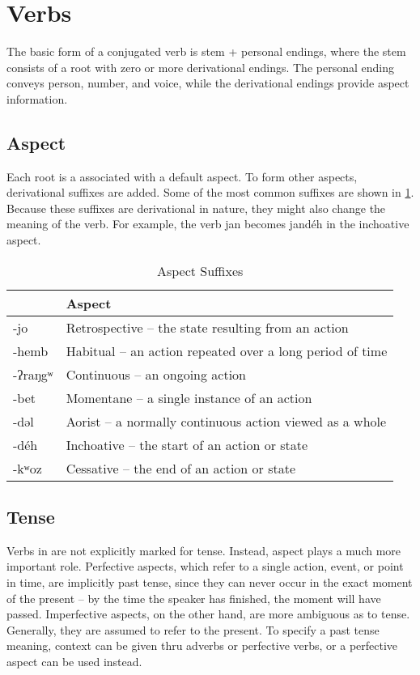 \section{Verbs}
The basic form of a conjugated verb is stem + personal endings, where the stem
consists of a root with zero or more derivational endings.
The personal ending conveys person, number, and voice, while the derivational
endings provide aspect information.

\subsection{Aspect}
Each root is a associated with a default aspect.
To form other aspects, derivational suffixes are added.
Some of the most common suffixes are shown in \cref{tab:aspect suffixes}.
Because these suffixes are derivational in nature, they might also change the
meaning of the verb.
For example, the verb {\ll jan}  becomes {\ll jandéh} 
in the inchoative aspect.

\begin{table}[h]
\centering
\caption{Aspect Suffixes}
\label{tab:aspect suffixes}
\begin{tabular}{>{\ll}l l}
    \toprule
    \multicolumn{1}{c}{Ending} & Aspect \\ \midrule
    -jo & Retrospective – the state resulting from an action \\
    -hemb & Habitual – an action repeated over a long period of time \\
    -ʔraŋgʷ & Continuous – an ongoing action \\
    -bet & Momentane – a single instance of an action \\
    -dəl & Aorist – a normally continuous action viewed as a whole \\
    -déh & Inchoative – the start of an action or state \\
    -kʷoz & Cessative – the end of an action or state \\
    \bottomrule
\end{tabular}
\end{table}

\subsection{Tense}
Verbs in \Langname{} are not explicitly marked for tense.
Instead, aspect plays a much more important role.
Perfective aspects, which refer to a single action, event, or point in time,
are implicitly past tense, since they can never occur in the exact moment of
the present – by the time the speaker has finished, the moment will have
passed.
Imperfective aspects, on the other hand, are more ambiguous as to tense.
Generally, they are assumed to refer to the present.
To specify a past tense meaning, context can be given thru adverbs or
perfective verbs, or a perfective aspect can be used instead.

